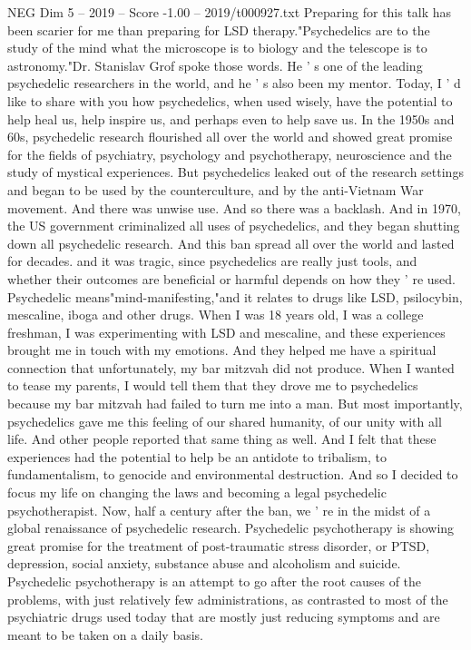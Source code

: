 \begin{textsample}{NEG Dim 5 – 2019 – Score -1.00 – 2019/t000927.txt}  \label{ex:f5_neg_006}
Preparing for this talk has been scarier for me than preparing for LSD therapy."Psychedelics are to the study of the mind what the microscope is to biology and the telescope is to astronomy."Dr.
Stanislav Grof spoke those words.
He ' s one of the leading psychedelic researchers in the world, and he ' s also been my mentor.
Today, I ' d like to share with you how psychedelics, when used wisely, have the potential to help heal us, help inspire us, and perhaps even to help save us.
In the 1950s and 60s, psychedelic research flourished all over the world and showed great promise for the fields of psychiatry, psychology and psychotherapy, neuroscience and the study of mystical experiences.
But psychedelics leaked out of the research settings and began to be used by the counterculture, and by the anti-Vietnam War movement.
And there was unwise use.
And so there was a backlash.
And in 1970, the US government criminalized all uses of psychedelics, and they began shutting down all psychedelic research.
And this ban spread all over the world and lasted for decades. and it was tragic, since psychedelics are really just tools, and whether their outcomes are beneficial or harmful depends on how they ' re used.
Psychedelic means"mind-manifesting,"and it relates to drugs like LSD, psilocybin, mescaline, iboga and other drugs.
When I was 18 years old, I was a college freshman, I was experimenting with LSD and mescaline, and these experiences brought me in touch with my emotions.
And they helped me have a spiritual connection that unfortunately, my bar mitzvah did not produce.
When I wanted to tease my parents, I would tell them that they drove me to psychedelics because my bar mitzvah had failed to turn me into a man.
But most importantly, psychedelics gave me this feeling of our shared humanity, of our unity with all life.
And other people reported that same thing as well.
And I felt that these experiences had the potential to help be an antidote to tribalism, to fundamentalism, to genocide and environmental destruction.
And so I decided to focus my life on changing the laws and becoming a legal psychedelic psychotherapist.
Now, half a century after the ban, we ' re in the midst of a global renaissance of psychedelic research.
Psychedelic psychotherapy is showing great promise for the treatment of post-traumatic stress disorder, or PTSD, depression, social anxiety, substance abuse and alcoholism and suicide.
Psychedelic psychotherapy is an attempt to go after the root causes of the problems, with just relatively few administrations, as contrasted to most of the psychiatric drugs used today that are mostly just reducing symptoms and are meant to be taken on a daily basis.

\end{textsample}
